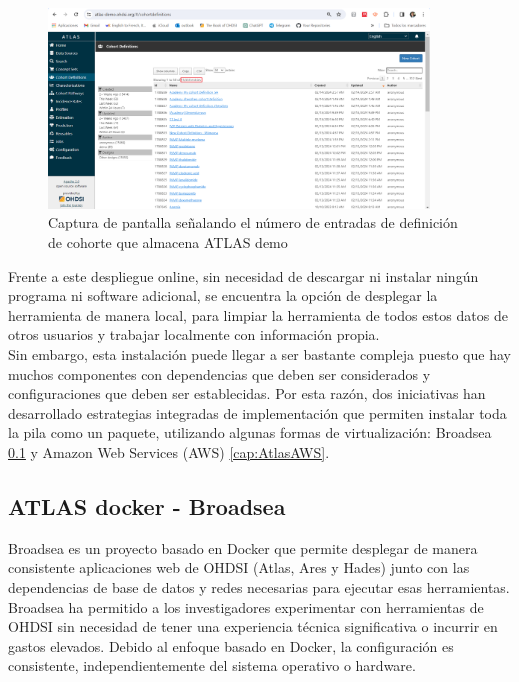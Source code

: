 \documentclass{article}
\begin{document}
\begin{figure}[H]
    \centering
    \includegraphics[width=0.90\textwidth]{images/atlasDemo(2).png}
    \caption{Captura de pantalla señalando el número de entradas de definición de cohorte que almacena ATLAS demo}
\end{figure}


Frente a este despliegue online, sin necesidad de descargar ni instalar ningún programa ni software adicional, se encuentra la opción de desplegar la herramienta de manera local, para limpiar la herramienta de todos estos datos de otros usuarios y trabajar localmente con información propia. \\

Sin embargo, esta instalación puede llegar a ser bastante compleja puesto que hay muchos componentes con dependencias que deben ser considerados y configuraciones que deben ser establecidas. Por esta razón, dos iniciativas han desarrollado estrategias integradas de implementación que permiten instalar toda la pila como un paquete, utilizando algunas formas de virtualización: Broadsea \ref{cap:AtlasBroadsea} y Amazon Web Services (AWS) \ref{cap:AtlasAWS}. \cite{TheBookOfOhdsi}


\subsection{ATLAS docker - Broadsea}\label{cap:AtlasBroadsea}

Broadsea es un proyecto basado en Docker que permite desplegar de manera consistente aplicaciones web de OHDSI (Atlas, Ares y Hades) junto con las dependencias de base de datos y redes necesarias para ejecutar esas herramientas. Broadsea ha permitido a los investigadores experimentar con herramientas de OHDSI sin necesidad de tener una experiencia técnica significativa o incurrir en gastos elevados. Debido al enfoque basado en Docker, la configuración es consistente, independientemente del sistema operativo o hardware.  \cite{Broadsea3.0}
\end{document}
